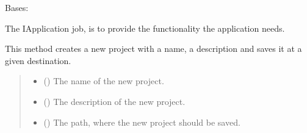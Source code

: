 \documentclass[letterpaper,10pt,english]{sphinxmanual}
\begin{document}
\begin{fulllineitems}
\label{\detokenize{apidoc/src.osm_configurator.model.application:src.osm_configurator.model.application.application_interface.IApplication}}
\pysigstartsignatures
{}
\pysigstopsignatures
\sphinxAtStartPar
Bases: 

\sphinxAtStartPar
The IApplication job, is to provide the functionality the application needs.

\begin{fulllineitems}
\label{\detokenize{apidoc/src.osm_configurator.model.application:src.osm_configurator.model.application.application_interface.IApplication.create_project}}
\pysigstartsignatures
{}
\pysigstopsignatures
\sphinxAtStartPar
This method creates a new project with a name, a description and saves it at a given destination.
\begin{quote}\begin{description}
\begin{itemize}
\item {} 
\sphinxAtStartPar
{} () \textendash{} The name of the new project.

\item {} 
\sphinxAtStartPar
{} () \textendash{} The description of the new project.

\item {} 
\sphinxAtStartPar
{} () \textendash{} The path, where the new project should be saved.


\end{itemize}
\end{description}
\end{quote}
\end{fulllineitems}
\end{fulllineitems}
\end{document}
